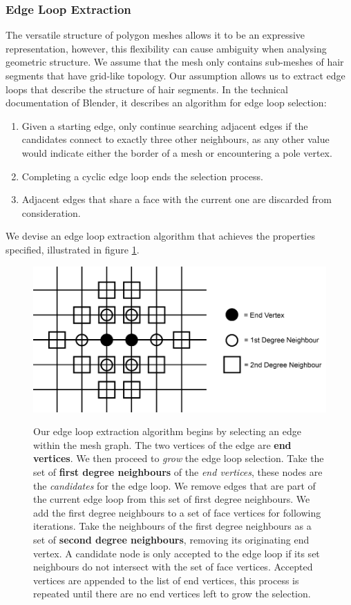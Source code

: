 \documentclass[ %
author={Dillon Keith Diep},
supervisor={Dr. Carl Henrik Ek},
degree={MEng},
title={ART-CG:},
subtitle={Assisted Real-time Content Generation of 3D Hair by Learning Manifolds},
type={Research},
year={2017} ]{dissertation}
\begin{document}
\subsubsection{Edge Loop Extraction}
The versatile structure of polygon meshes allows it to be an expressive representation, however, this flexibility can cause ambiguity when analysing geometric structure. We assume that the mesh only contains sub-meshes of hair segments that have grid-like topology. Our assumption allows us to extract edge loops that describe the structure of hair segments. In the technical documentation of Blender, it describes an algorithm for edge loop selection\cite{blenderedgeloop}:
\begin{enumerate}
\item Given a starting edge, only continue searching adjacent edges if the candidates connect to exactly three other neighbours, as any other value would indicate either the border of a mesh or encountering a pole vertex.
\item Completing a cyclic edge loop ends the selection process.
\item Adjacent edges that share a face with the current one are discarded from consideration.
\end{enumerate}
We devise an edge loop extraction algorithm that achieves the properties specified, illustrated in figure \ref{edgeLoopFig}.

\begin{figure}[!h]
	\centering
	\caption{Our edge loop extraction algorithm begins by selecting an edge within the mesh graph. The two vertices of the edge are \textbf{end vertices}. We then proceed to \textit{grow} the edge loop selection. Take the set of \textbf{first degree neighbours} of the \textit{end vertices}, these nodes are the \textit{candidates} for the edge loop. We remove edges that are part of the current edge loop from this set of first degree neighbours. We add the first degree neighbours to a set of face vertices for following iterations. Take the neighbours of the first degree neighbours as a set of \textbf{second degree neighbours}, removing its originating end vertex. A candidate node is only accepted to the edge loop if its set neighbours do not intersect with the set of face vertices. Accepted vertices are appended to the list of end vertices, this process is repeated until there are no end vertices left to grow the selection.}
	\includegraphics[scale=0.35]{images/edgeLoopDiagram}\\
	
	\label{edgeLoopFig}
\end{figure}
\end{document}
